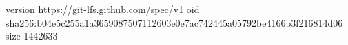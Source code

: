 version https://git-lfs.github.com/spec/v1
oid sha256:b04e5c255a1a3659087507112603e0e7ac742445a05792be4166b3f216814d06
size 1442633
